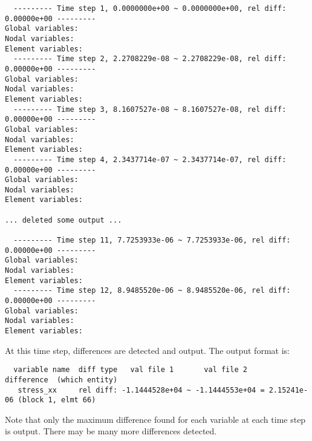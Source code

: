 \begin{verbatim} 
  --------- Time step 1, 0.0000000e+00 ~ 0.0000000e+00, rel diff:  0.00000e+00 ---------
Global variables:
Nodal variables:
Element variables:
  --------- Time step 2, 2.2708229e-08 ~ 2.2708229e-08, rel diff:  0.00000e+00 ---------
Global variables:
Nodal variables:
Element variables:
  --------- Time step 3, 8.1607527e-08 ~ 8.1607527e-08, rel diff:  0.00000e+00 ---------
Global variables:
Nodal variables:
Element variables:
  --------- Time step 4, 2.3437714e-07 ~ 2.3437714e-07, rel diff:  0.00000e+00 ---------
Global variables:
Nodal variables:
Element variables:

... deleted some output ...

  --------- Time step 11, 7.7253933e-06 ~ 7.7253933e-06, rel diff:  0.00000e+00 ---------
Global variables:
Nodal variables:
Element variables:
  --------- Time step 12, 8.9485520e-06 ~ 8.9485520e-06, rel diff:  0.00000e+00 ---------
Global variables:
Nodal variables:
Element variables:
\end{verbatim}

\sectionline
At this time step, differences are detected and output.  The output
format is:

\begin{verbatim}
  variable name  diff type   val file 1       val file 2     difference  (which entity)
   stress_xx     rel diff: -1.1444528e+04 ~ -1.1444553e+04 = 2.15241e-06 (block 1, elmt 66)
\end{verbatim}	

Note that only the maximum difference found for each variable at each
time step is output.  There may be many more differences detected.

